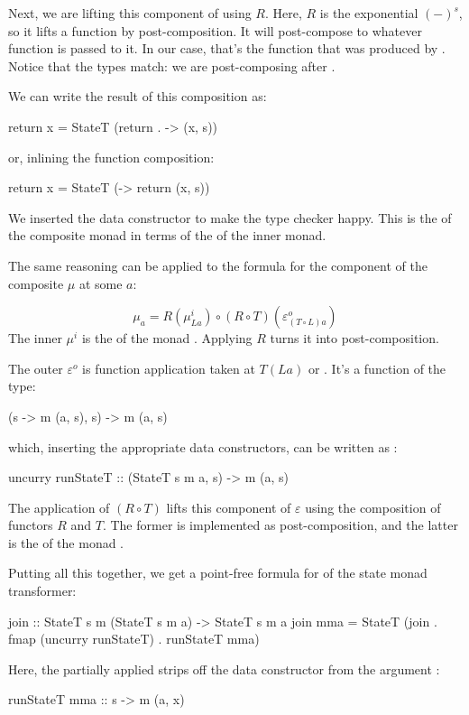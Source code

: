 \documentclass[DaoFP]{subfiles}
\begin{document}
Next, we are lifting this component of  using $R$. Here, $R$ is the exponential $(-)^s$, so it lifts a function by post-composition. It will post-compose  to whatever function is passed to it. In our case, that's the function that was produced by . Notice that the types match: we are post-composing  after . 

We can write the result of this composition as:
\begin{haskell}
return x = StateT (return . \s -> (x, s))
\end{haskell}
or, inlining the function composition:
\begin{haskell}
return x = StateT (\s -> return (x, s))
\end{haskell}
We inserted the data constructor  to make the type checker happy. This is the  of the composite monad in terms of the  of the inner monad.

The same reasoning can be applied to the formula for the component of the composite $\mu$ at some $a$: 

\[ \mu_a = R(\mu^i_{L a}) \circ (R \circ T) (\varepsilon^o_{(T\circ L) a})\]
The inner $\mu^i$ is the  of the monad . Applying $R$ turns it into post-composition. 

The outer $\varepsilon^o$ is function application taken at $T(L a)$ or . It's a function of the type:
\begin{haskell}
(s -> m (a, s), s) -> m (a, s)
\end{haskell}
which, inserting the appropriate data constructors, can be written as :
\begin{haskell}
uncurry runStateT :: (StateT s m a, s) -> m (a, s)
\end{haskell}
The application of $(R \circ T)$ lifts this component of $\varepsilon$ using the composition of functors $R$ and $T$. The former is implemented as  post-composition, and the latter is the  of the monad . 

Putting all this together, we get a point-free formula for  of the state monad transformer:
\begin{haskell}
join :: StateT s m (StateT s m a) -> StateT s m a
join mma = StateT (join . fmap (uncurry runStateT) . runStateT mma)
\end{haskell}
Here, the partially applied  strips off the data constructor from the argument :
\begin{haskell}
runStateT mma :: s -> m (a, x)
\end{haskell}
\end{document}

